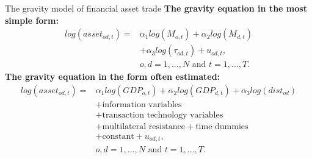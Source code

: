 \documentclass{beamer}
\begin{document}
\begin{frame}{The gravity model of financial asset trade}
\textbf{The gravity equation in the most simple form:}
\begin{align}
log(asset_{od,t}) = & \alpha_1 log(M_{o,t}) + \alpha_2 log(M_{d,t})  \nonumber \\
& + \alpha_3 log(\tau_{od,t}) + u_{od,t}, \\
& o, d=1, ..., N \text{ and } t=1, ..., T. \nonumber
\label{simple gravity}
\end{align}
\textbf{The gravity equation in the form often estimated:}
\begin{align}
log(asset_{od,t})= & \alpha_1 log(GDP_{o,t})+\alpha_2 log(GDP_{d,t}) +\alpha_3 log(dist_{od}) \nonumber\\
& + \text{information variables} \nonumber\\
& + \text{transaction technology variables}\nonumber\\
& + \text{multilateral resistance} + \text{time dummies} \nonumber\\
& + \text{constant}+ u_{od,t},  \\
& o, d=1, ..., N \text{ and } t=1, ..., T. \nonumber
\label{usual gravity}
\end{align}
\end{frame}

\end{document}
